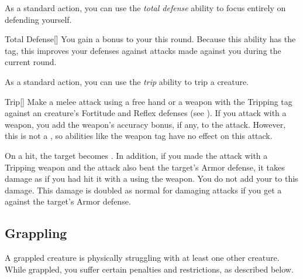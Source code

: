         \label{Total Defense} As a standard action, you can use the \textit{total defense} ability to focus entirely on defending yourself.

        \begin{activeability}{Total Defense}[]
            \rankline
            You gain a  bonus to your  this round.
            Because this ability has the  tag, this improves your defenses against attacks made against you during the current round.
        \end{activeability}

        \label{Trip} As a standard action, you can use the \textit{trip} ability to trip a creature.

        \begin{activeability}{Trip}[]
            \rankline
            Make a melee attack using a free hand or a weapon with the Tripping tag against an creature's Fortitude and Reflex defenses (see ).
            If you attack with a weapon, you add the weapon's accuracy bonus, if any, to the attack.
            However, this is not a , so abilities like the  weapon tag have no effect on this attack.

            On a hit, the target becomes \prone.
            In addition, if you made the attack with a Tripping weapon and the attack also beat the target's Armor defense, it takes damage as if you had hit it with a  using the weapon.
            You do not add your  to this damage.
            This damage is doubled as normal for damaging attacks if you get a  against the target's Armor defense.
        \end{activeability}

    \subsection{Grappling}\label{Grappling}
        A grappled creature is physically struggling with at least one other creature.
        While grappled, you suffer certain penalties and restrictions, as described below.


